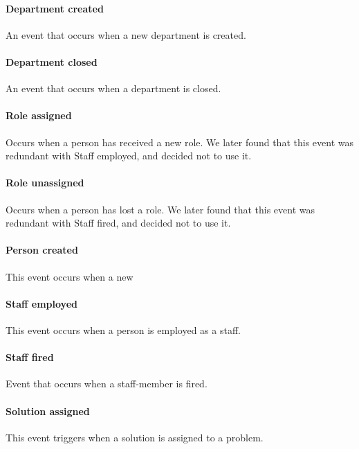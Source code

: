 \paragraph{Department created}
An event that occurs when a new department is created.

\paragraph{Department closed}
An event that occurs when a department is closed.

\paragraph{Role assigned}
Occurs when a person has received a new role. We later found that this event was redundant with Staff employed, and decided not to use it.

\paragraph{Role unassigned}
Occurs when a person has lost a role. We later found that this event was redundant with Staff fired, and decided not to use it.

\paragraph{Person created}
This event occurs when a new 

\paragraph{Staff employed}
This event occurs when a person is employed as a staff.

\paragraph{Staff fired}
Event that occurs when a staff-member is fired.

\paragraph{Solution assigned}
This event triggers when a solution is assigned to a problem.

